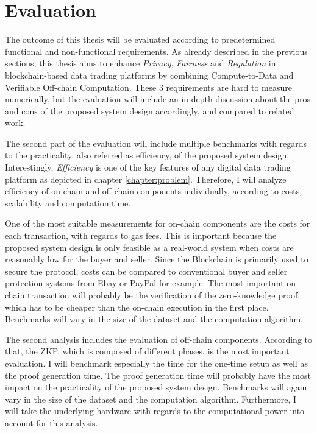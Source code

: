 \chapter{Evaluation}
\label{cha:evaluation}

The outcome of this thesis will be evaluated according to predetermined functional and non-functional requirements. As already described in the previous sections, this thesis aims to enhance \emph{Privacy}, \emph{Fairness} and \emph{Regulation} in blockchain-based data trading platforms by combining Compute-to-Data and Verifiable Off-chain Computation. These 3 requirements are hard to measure numerically, but the evaluation will include an in-depth discussion about the pros and cons of the proposed system design accordingly, and compared to related work. %

The second part of the evaluation will include multiple benchmarks with regards to the practicality, also referred as efficiency, of the proposed system design. Interestingly, \emph{Efficiency} is one of the key features of any digital data trading platform as depicted in chapter \ref{chapter:problem}. %
Therefore, I will analyze efficiency of on-chain and off-chain components individually, according to costs, scalability and computation time.

One of the most suitable measurements for on-chain components are the costs for each transaction, with regards to gas fees. This is important because the proposed system design is only feasible as a real-world system when costs are reasonably low for the buyer and seller. Since the Blockchain is primarily used to secure the protocol, costs can be compared to conventional buyer and seller protection systems from Ebay or PayPal for example. The most important on-chain transaction will probably be the verification of the zero-knowledge proof, which has to be cheaper than the on-chain execution in the first place. Benchmarks will vary in the size of the dataset and the computation algorithm.

The second analysis includes the evaluation of off-chain components. According to that, the ZKP, which is composed of different phases, is the most important evaluation. I will benchmark especially the time for the one-time setup as well as the proof generation time. The proof generation time will probably have the most impact on the practicality of the proposed system design. Benchmarks will again vary in the size of the dataset and the computation algorithm. Furthermore, I will take the underlying hardware with regards to the computational power into account for this analysis. 

